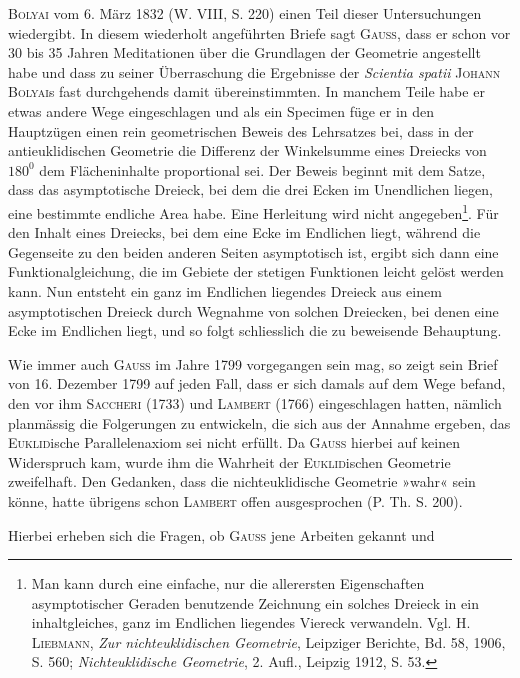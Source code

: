 \clearpage{}\setcounter{footnote}{0}
\noindent\textsc{Bolyai} vom 6. März 1832 (W. VIII, S. 220) einen Teil dieser Untersuchungen
wiedergibt. In diesem wiederholt angeführten Briefe sagt \textsc{Gauss}, dass er schon vor
30 bis 35 Jahren Meditationen über die Grundlagen der Geometrie angestellt habe
und dass zu seiner Überraschung die Ergebnisse der \textit{Scientia spatii} \textsc{Johann Bolyai}s
fast durchgehends damit übereinstimmten. In manchem Teile habe er etwas
andere Wege eingeschlagen und als ein Specimen füge er in den Hauptzügen
einen rein geometrischen Beweis des Lehrsatzes bei, dass in der antieuklidischen
Geometrie die Differenz der Winkelsumme eines Dreiecks von \(180^0\) dem
Flächeninhalte proportional sei. Der Beweis beginnt mit dem Satze, dass das
asymptotische Dreieck, bei dem die drei Ecken im Unendlichen liegen, eine
bestimmte endliche Area habe. Eine Herleitung wird nicht angegeben\footnote{Man kann durch eine einfache, nur die allerersten Eigenschaften asymptotischer Geraden benutzende Zeichnung ein solches Dreieck in ein inhaltgleiches, ganz im Endlichen liegendes Viereck verwandeln. Vgl. H. \textsc{Liebmann}, \textit{Zur nichteuklidischen Geometrie}, Leipziger Berichte, Bd. 58, 1906, S. 560; \textit{Nichteuklidische Geometrie}, 2. Aufl., Leipzig 1912, S. 53.}. Für
den Inhalt eines Dreiecks, bei dem eine Ecke im Endlichen liegt, während
die Gegenseite zu den beiden anderen Seiten asymptotisch ist, ergibt sich
dann eine Funktionalgleichung, die im Gebiete der stetigen Funktionen leicht
gelöst werden kann. Nun entsteht ein ganz im Endlichen liegendes Dreieck
aus einem asymptotischen Dreieck durch Wegnahme von solchen Dreiecken,
bei denen eine Ecke im Endlichen liegt, und so folgt schliesslich die zu beweisende
Behauptung.
\par
Wie immer auch \textsc{Gauss} im Jahre 1799 vorgegangen sein mag, so zeigt
sein Brief von 16. Dezember 1799 auf jeden Fall, dass er sich damals auf
dem Wege befand, den vor ihm \textsc{Saccheri} (1733) und \textsc{Lambert} (1766) eingeschlagen
hatten, nämlich planmässig die Folgerungen zu entwickeln, die sich
aus der Annahme ergeben, das \textsc{Euklid}ische Parallelenaxiom sei nicht erfüllt.
Da \textsc{Gauss} hierbei auf keinen Widerspruch kam, wurde ihm die Wahrheit der
\textsc{Euklid}ischen Geometrie zweifelhaft. Den Gedanken, dass die nichteuklidische
Geometrie »wahr« sein könne, hatte übrigens schon \textsc{Lambert} offen ausgesprochen
(P. Th. S. 200).
\par
Hierbei erheben sich die Fragen, ob \textsc{Gauss} jene Arbeiten gekannt und
